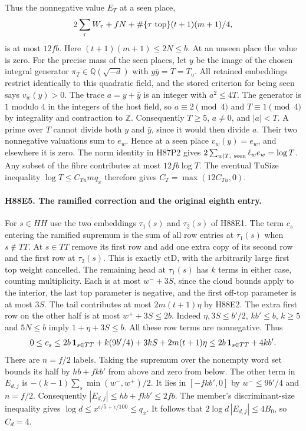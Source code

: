 Thus the nonnegative value $E_T$ at a seen place,
\[
            2\sum_\tau W_\tau+fN+
                \#\{\tau\ {\rm top}\}(t+1)(m+1)/4 ,
\]
is at most $12fb$. Here $(t+1)(m+1)\le2N\le b$.
At an unseen place the value is zero. For the precise mass of the
seen places, let $y$ be the image of the chosen integral generator
$\pi_T\in\mathbb Q(\sqrt{-d})$ with $y\bar y=T=T_u$.
All retained embeddings restrict identically to this quadratic
field, and the stored criterion for being seen says $v_w(y)>0$.
The trace $a=y+\bar y$ is an integer with $a^2\le4T$.
The generator is $1$ modulo $4$ in the integers of the host
field, so $a\equiv2\pmod4$ and $T\equiv1\pmod4$
by integrality and contraction to $\mathbb Z$. Consequently
$T\ge5$, $a\ne0$, and $|a|<T$. A prime over $T$ cannot divide
both $y$ and $\bar y$, since it would then divide $a$.
Their two nonnegative valuations sum to $e_w$. Hence at a seen
place $v_w(y)=e_w$, and elsewhere it is zero. The norm identity
in H87P2 gives $2\sum_{w\mid T,\ {\rm seen}}\ell_we_w=\log T$.
Any subset of the fibre contributes at most $12fb\log T$.
The eventual $\mathrm{TuSize}$ inequality $\log T\le C_{Tu}mq_x$
therefore gives $C_T=\max(12C_{Tu},0)$.

\paragraph{H88E5. The ramified correction and the original eighth entry.}
For $s\in HH$ use the two embeddings $\tau_1(s)$ and $\tau_2(s)$
of H88E1. The term $c_s$ entering the ramified supremum is the
sum of all row entries at $\tau_1(s)$ when $s\notin TT$. At $s\in TT$
remove its first row and add one extra copy of its second row
and the first row at $\tau_2(s)$. This is exactly
$\mathrm{ctD}$, with the arbitrarily large first top weight cancelled.
The remaining head at $\tau_1(s)$ has $k$ terms in either case,
counting multiplicity. Each is at most $w^-+3S$, since the cloud
bounds apply to the interior, the last top parameter is negative,
and the first off-top parameter is at most $3S$. The tail contributes
at most $2m(t+1)\eta$ by H88E2. The extra first row on the other
half is at most $w^++3S\le2b$. Indeed $\eta,3S\le b'/2$,
$kb'\le b$, $k\ge5$ and $5N\le b$ imply $1+\eta+3S\le b$.
All these row terms are nonnegative. Thus
\[
 0\le c_s\le 2b\,{\bf1}_{s\in TT}+
      k(9b'/4)+3kS+2m(t+1)\eta
 \le 2b\,{\bf1}_{s\in TT}+4kb'.
\]
There are $n=f/2$ labels. Taking the supremum over the nonempty
word set bounds its half by $hb+fkb'$ from above and zero from below.
The other term in $E_{d,j}$ is
$-(k-1)\sum_s\min(w^-,w^+)/2$. It lies in $[-fkb',0]$
by $w^-\le9b'/4$ and $n=f/2$.
Consequently $|E_{d,j}|\le hb+fkb'\le2fb$. The
member's discriminant-size inequality gives
$\log d\le x^{\epsilon/5+\epsilon/100}\le q_x$. It follows that
$2\log d\,|E_{d,j}|\le4B_0$, so $C_d=4$.


